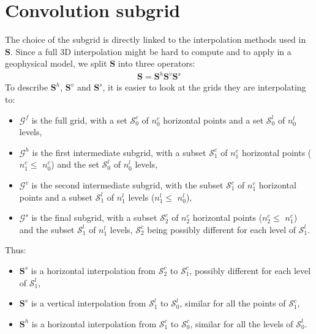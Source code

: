 \documentclass[12pt]{scrartcl}
\begin{document}
\section{Convolution subgrid}
The choice of the subgrid is directly linked to the interpolation methods used in $\mathbf{S}$. Since a full 3D interpolation might be hard to compute and to apply in a geophysical model, we split $\mathbf{S}$ into three operators:
\begin{align}
\mathbf{S} = \mathbf{S}^h \mathbf{S}^v \mathbf{S}^s
\end{align}
To describe $\mathbf{S}^h$, $\mathbf{S}^v$ and $\mathbf{S}^s$, it is easier to look at the grids they are interpolating to:
\begin{itemize}
\item $\mathcal{G}^f$ is the full grid, with a set $\mathcal{S}^c_0$ of $n^c_0$ horizontal points and a set $\mathcal{S}^l_0$ of $n^l_0$ levels,
\item $\mathcal{G}^h$ is the first intermediate subgrid, with a subset $\mathcal{S}^c_1$ of $n^c_1$ horizontal points ($n^c_1 \le$ $n^c_0$) and the set $\mathcal{S}^l_0$ of $n^l_0$ levels,
\item $\mathcal{G}^v$ is the second intermediate subgrid, with the subset $\mathcal{S}^c_1$ of $n^c_1$ horizontal points and a subset $\mathcal{S}^l_1$ of $n^l_1$ levels ($n^l_1 \le$ $n^l_0$),
\item $\mathcal{G}^s$ is the final subgrid, with a subset $\mathcal{S}^c_2$ of $n^c_2$ horizontal points ($n^c_2 \le$ $n^c_1$) and the subset $\mathcal{S}^l_1$ of $n^l_1$ levels, $\mathcal{S}^c_2$ being possibly different for each level of $\mathcal{S}^l_1$.
\end{itemize}
Thus:
\begin{itemize}
\item $\mathbf{S}^s$ is a horizontal interpolation from $\mathcal{S}^c_2$ to $\mathcal{S}^c_1$, possibly different for each level of $\mathcal{S}^l_1$,
\item $\mathbf{S}^v$ is a vertical interpolation from $\mathcal{S}^l_1$ to $\mathcal{S}^l_0$, similar for all the points of $\mathcal{S}^c_1$,
\item $\mathbf{S}^h$ is a horizontal interpolation from $\mathcal{S}^c_1$ to $\mathcal{S}^c_0$, similar for all the levels of $\mathcal{S}^l_0$.
\end{itemize}
\end{document}
